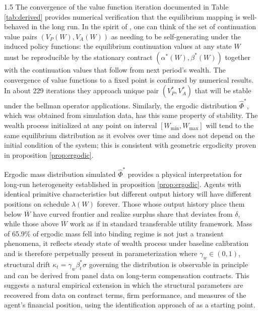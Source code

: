 \documentclass[12pt]{article}
\theoremstyle{definition}
\theoremstyle{plain}
\begin{document}
\begin{spacing}{1.5}
The convergence of the value function iteration documented in Table \ref{tab:derived} provides numerical verification that the equilibrium mapping is well-behaved in the long run. In the spirit of \textcite{abreu1990}, one can think of the set of continuation value pairs $(V_P(W), V_A(W))$ as needing to be self-generating under the induced policy functions: the equilibrium continuation values at any state $W$ must be reproducible by the stationary contract $(\alpha^*(W), \beta^*(W))$ together with the continuation values that follow from next period's wealth.  The convergence of value functions to a fixed point is confirmed by numerical results. In about 229 iterations they approach unique pair $(V_P^*, V_A^*)$ that will be stable under the bellman operator applications. Similarly, the ergodic distribution $\hat{\Phi}^*$, which was obtained from simulation data, has this same property of stability. The wealth process initialized at any point on interval $ [W_{\min}, W_{\max}] $ will tend to the same equilibrium distribution as it evolves over time and does not depend on the initial condition of the system; this is consistent with geometric ergodicity proven in proposition \ref{prop:ergodic}.

Ergodic mass distribution simulated $\hat{\Phi}^*$ provides a physical interpretation for long-run heterogeneity established in proposition \ref{prop:ergodic}. Agents with identical primitive characteristics but different output history will have different positions on schedule $\lambda(W)$ forever. Those whose output history place them below $\overline{W}$ have curved frontier and realize surplus share that deviates from $\delta$, while those above $\overline{W}$ work as if in standard transferable utility framework. Mass of 65.9\% of ergodic mass fell into binding regime is not just a transient phenomena, it reflects steady state of wealth process under baseline calibration and is therefore perpetually present in parameterization where $\gamma_w \in (0,1)$, structural drift $\kappa_t = \gamma_w \beta_t^* \sigma$ governing the distribution is observable in principle and can be derived from panel data on long-term compensation contracts. This suggests a natural empirical extension in which the structural parameters are recovered from data on contract terms, firm performance, and measures of the agent's financial position, using the identification approach of \textcite{digiannatale2025} as a starting point.

\newpage
 

\end{spacing}
\end{document}

